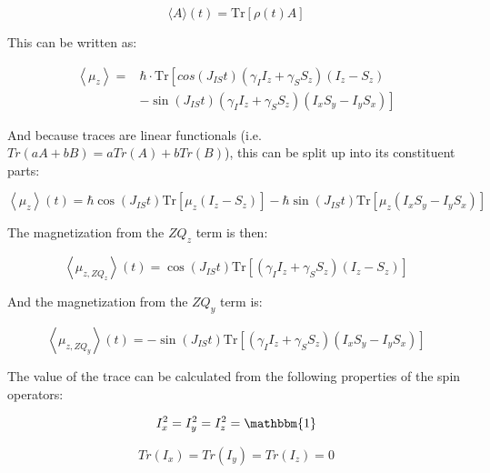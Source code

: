 \documentclass[PaulGanssle-Thesis.tex]{subfiles}
\begin{document}
\begin{equation}
\label{eqn:ExpectationValueFromDensityMatrix}
\langle A\rangle(t) = \mathrm{Tr}\left[\rho(t)A\right]
\end{equation}

This can be written as:

\begin{align}
\left\langle\mu_{z}\right\rangle = & \hbar\cdot\mathrm{Tr}\left[cos(J_{IS}t)(\gamma_{I}I_{z} + \gamma_{S}S_{z})(I_{z} - S_{z})\right.\nonumber \\
& \left. - \sin(J_{IS}t)(\gamma_{I}I_{z} + \gamma_{S}S_{z})(I_{x}S_{y} - I_{y}S_{x}) \right]
\end{align}

And because traces are linear functionals (i.e. $Tr(aA + bB) = aTr(A) + bTr(B)$), this can be split up into its constituent parts:

\begin{equation}
\left\langle\mu_{z}\right\rangle(t) = \hbar\cos\left(J_{IS}t\right)\mathrm{Tr}\left[\mu_{z}\left(I_{z} - S_{z}\right)\right] - \hbar\sin\left(J_{IS}t\right)\mathrm{Tr}\left[\mu_{z}\left(I_{x}S_{y} - I_{y}S_{x}\right)\right]
\end{equation}

The magnetization from the $ZQ_{z}$ term is then:

\begin{equation}
\left\langle\mu_{z,ZQ_{z}}\right\rangle(t) = \cos(J_{IS}t)\mathrm{Tr}\left[(\gamma_{I}I_{z} + \gamma_{S}S_{z})(I_{z}-S_{z})\right]
\end{equation}

And the magnetization from the $ZQ_{y}$ term is:

\begin{equation}
\left\langle\mu_{z,ZQ_{y}}\right\rangle(t) = -\sin(J_{IS}t)\mathrm{Tr}\left[(\gamma_{I}I_{z} + \gamma_{S}S_{z})(I_{x}S_{y}-I_{y}S_{x})\right]
\end{equation}

The value of the trace can be calculated from the following properties of the spin operators:

\begin{equation}
\label{eqn:SpinOpsIdentity}
I_{x}^2 = I_{y}^2 = I_{z}^2 = \mathbbm{1} 
\end{equation}

\begin{equation}
Tr(I_{x}) = Tr(I_{y}) = Tr(I_{z}) = 0
\label{eqn:SpinOpsTraceless}
\end{equation}
\end{document}
